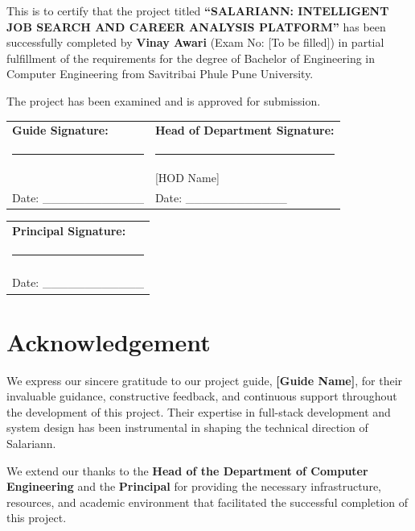 \documentclass[12pt,a4paper,oneside]{report}
\begin{document}
\vspace{1.5cm}

This is to certify that the project titled \textbf{``SALARIANN: INTELLIGENT JOB SEARCH AND CAREER ANALYSIS PLATFORM''} has been successfully completed by \textbf{Vinay Awari} (Exam No: [To be filled]) in partial fulfillment of the requirements for the degree of Bachelor of Engineering in Computer Engineering from Savitribai Phule Pune University.

The project has been examined and is approved for submission.

\vspace{2cm}

\begin{tabular}{p{4cm}p{4cm}}
    \textbf{Guide Signature:} & \textbf{Head of Department Signature:}\\
    \hrule & \hrule \\
    [Guide Name] & [HOD Name]\\
    Date: \_\_\_\_\_\_\_\_\_\_\_\_ & Date: \_\_\_\_\_\_\_\_\_\_\_\_
\end{tabular}

\vspace{2cm}

\begin{tabular}{p{8cm}}
    \textbf{Principal Signature:}\\
    \hrule \\
    [Principal Name]\\
    Date: \_\_\_\_\_\_\_\_\_\_\_\_
\end{tabular}

\newpage
\thispagestyle{frontmatter}
\chapter*{Acknowledgement}

We express our sincere gratitude to our project guide, \textbf{[Guide Name]}, for their invaluable guidance, constructive feedback, and continuous support throughout the development of this project. Their expertise in full-stack development and system design has been instrumental in shaping the technical direction of Salariann.

We extend our thanks to the \textbf{Head of the Department of Computer Engineering} and the \textbf{Principal} for providing the necessary infrastructure, resources, and academic environment that facilitated the successful completion of this project.
\end{document}
